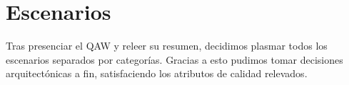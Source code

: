 


\newcommand\escenario[7]{
	\begin{itemize}
		\item \textit{#1}  
		
		\item \textbf{Fuente:} #2
		\item \textbf{Estímulo:} #3
		\item \textbf{Entorno:} #4
		\item \textbf{Artefacto:} #5
		\item \textbf{Respuesta:} #6
		\item \textbf{Medición:} #7
		
		
	\end{itemize}
}








%

\section{Escenarios}

Tras presenciar el QAW y releer su resumen, decidimos plasmar todos los escenarios separados por categor\'ias. Gracias a esto pudimos tomar decisiones arquitect\'onicas a fin, satisfaciendo los atributos de calidad relevados.



\bigskip


\bigskip


\bigskip


\bigskip




%
